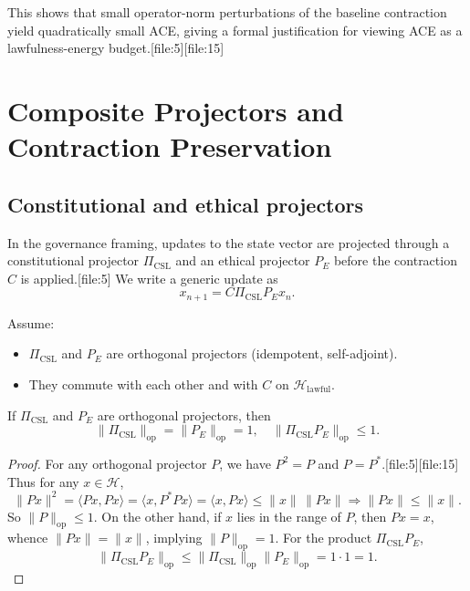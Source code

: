 \documentclass[11pt]{article}
\begin{document}
This shows that small operator-norm perturbations of the baseline contraction yield quadratically small ACE, giving a formal justification for viewing ACE as a lawfulness-energy budget.[file:5][file:15]

\section{Composite Projectors and Contraction Preservation}

\subsection{Constitutional and ethical projectors}

In the governance framing, updates to the state vector are projected through a constitutional projector \(\Pi_{\mathrm{CSL}}\) and an ethical projector \(P_E\) before the contraction \(C\) is applied.[file:5]  
We write a generic update as
\[
x_{n+1} = C \Pi_{\mathrm{CSL}} P_E x_n.
\]

Assume:

\begin{itemize}
  \item \(\Pi_{\mathrm{CSL}}\) and \(P_E\) are orthogonal projectors (idempotent, self-adjoint).
  \item They commute with each other and with \(C\) on \(\mathcal{H}_{\mathrm{lawful}}\).
\end{itemize}

\begin{lemma}
If \(\Pi_{\mathrm{CSL}}\) and \(P_E\) are orthogonal projectors, then
\[
\|\Pi_{\mathrm{CSL}}\|_{\mathrm{op}} = \|P_E\|_{\mathrm{op}} = 1,\quad
\|\Pi_{\mathrm{CSL}} P_E\|_{\mathrm{op}} \le 1.
\]
\end{lemma}

\begin{proof}
For any orthogonal projector \(P\), we have \(P^2 = P\) and \(P=P^\ast\).[file:5][file:15]  
Thus for any \(x\in\mathcal{H}\),
\[
\|Px\|^2 = \langle Px, Px\rangle = \langle x, P^\ast P x\rangle = \langle x, Px\rangle \le \|x\|\,\|Px\| \Rightarrow \|Px\| \le \|x\|.
\]
So \(\|P\|_{\mathrm{op}} \le 1\).  
On the other hand, if \(x\) lies in the range of \(P\), then \(Px = x\), whence \(\|Px\| = \|x\|\), implying \(\|P\|_{\mathrm{op}}=1\).  
For the product \(\Pi_{\mathrm{CSL}} P_E\),
\[
\|\Pi_{\mathrm{CSL}} P_E\|_{\mathrm{op}} \le \|\Pi_{\mathrm{CSL}}\|_{\mathrm{op}} \|P_E\|_{\mathrm{op}} = 1\cdot 1 = 1.
\]
\end{proof}
\end{document}
